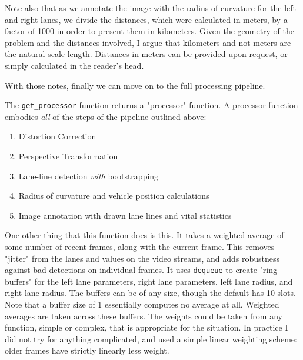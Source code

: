 \documentclass[11pt]{article}
\begin{document}
Note also that as we annotate the image with the radius of
curvature for the left and right lanes, we divide the
distances, which were calculated in meters, by a factor of 1000
in order to present them in kilometers.  Given the geometry of
the problem and the distances involved, I argue that kilometers
and not meters are the natural scale length.  Distances in
meters can be provided upon request, or simply calculated in the
reader's head.

With those notes, finally we can move on to the full processing
pipeline.  

The \texttt{get\_processor} function returns a "processor" function.  A
processor function embodies \emph{all} of the steps of the pipeline
outlined above:

\begin{enumerate}
\item Distortion Correction
\item Perspective Transformation
\item Lane-line detection \emph{with} bootstrapping
\item Radius of curvature and vehicle position calculations
\item Image annotation with drawn lane lines and vital statistics
\end{enumerate}

One other thing that this function does is this.  It takes a
weighted average of some number of recent frames, along with the
current frame.  This removes "jitter" from the lanes and values
on the video streams, and adds robustness against bad detections
on individual frames.  It uses \texttt{dequeue} to create "ring
buffers" for the left lane parameters, right lane parameters,
left lane radius, and right lane radius.  The buffers can be of
any size, though the default has 10 slots.  Note that a buffer
size of 1 essentially computes no average at all.  Weighted
averages are taken across these buffers.  The weights could be
taken from any function, simple or complex, that is appropriate
for the situation.  In practice I did not try for anything
complicated, and used a simple linear weighting scheme:  older
frames have strictly linearly less weight.
\end{document}
